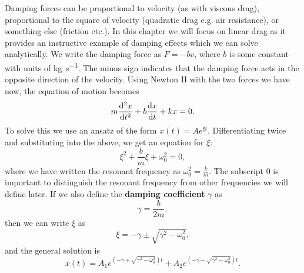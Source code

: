 \documentclass[../classical_mechanics.tex]{subfiles}
\begin{document}
        Damping forces can be proportional to velocity (as with viscous drag), proportional to the square of velocity (quadratic drag e.g. air resistance), or something else (friction etc.).
        In this chapter we will focus on linear drag as it provides an instructive example of damping effects which we can solve analytically.
        We write the damping force as $F=-bv$, where $b$ is some constant with units of \unit{\kilogram\per\second}.
        The minus sign indicates that the damping force acts in the opposite direction of the velocity.
        Using Newton II with the two forces we have now, the equation of motion becomes
        \begin{equation}
            m\dv[2]{x}{t}+b\dv{x}{t}+kx=0.
        \end{equation}
        To solve this we use an ansatz of the form $x(t)=Ae^{\xi t}$.
        Differentiating twice and substituting into the above, we get an equation for $\xi$:
        \begin{equation}
            \xi^2+\frac{b}{m}\xi+\omega_0^2=0,
        \end{equation}
        where we have written the resonant frequency as $\omega_0^2=\frac{k}{m}$.
        The subscript 0 is important to distinguish the resonant frequency from other frequencies we will define later.
        If we also define the \textbf{damping coefficient} $\gamma$ as
        \begin{equation}
            \gamma=\frac{b}{2m},
        \end{equation}
        then we can write $\xi$ as
        \begin{equation}
            \xi=-\gamma\pm\sqrt{\gamma^2-\omega_0^2},
        \end{equation}
        and the general solution is
        \begin{equation}
            x(t)=A_1e^{(-\gamma+\sqrt{\gamma^2-\omega_0^2})t}+A_2e^{(-\gamma-\sqrt{\gamma^2-\omega_0^2})t}.
        \end{equation}
\end{document}
